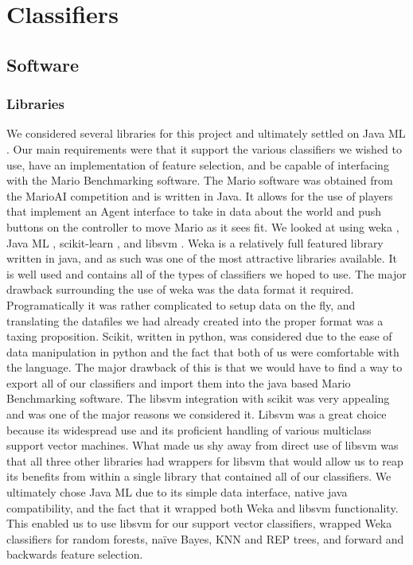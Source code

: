 \documentclass[]{article}   %
\begin{document}
\section{Classifiers}
\subsection{Software}
\subsubsection{Libraries}
We considered several libraries for this project and ultimately settled on Java ML \cite{javaml}. Our main 
requirements were that it support the various classifiers we wished to use, have an implementation of feature 
selection, and be capable of interfacing with the Mario Benchmarking \cite{mariobenchmark} software. The 
Mario software was obtained from the MarioAI competition and is written in Java. It allows for the use of 
players that implement an Agent interface to take in data about the world and push buttons on the controller 
to move Mario as it sees fit. We looked at using weka \cite{weka}, Java ML \cite{javaml}, scikit-learn 
\cite{scikit}, and libsvm \cite{libsvm}. 
\newline\newline
Weka is a relatively full featured library written in java, and as such was one of the most attractive libraries 
available. It is well used and contains all of the types of classifiers we hoped to use. The major drawback 
surrounding the use of weka was the data format it required. Programatically it was rather complicated to setup 
data on the fly, and translating the datafiles we had already created into the proper format was a taxing proposition. 
\newline\newline
Scikit, written in python, was considered due to the ease of data manipulation in python and the fact that both 
of us were comfortable with the language. The major drawback of this is that we would have to find a way to 
export all of our classifiers and import them into the java based Mario Benchmarking software. The libsvm 
integration with scikit was very appealing and was one of the major reasons we considered it.
\newline\newline
Libsvm was a great choice because its widespread use and its proficient handling of various multiclass support 
vector machines. What made us shy away from direct use of libsvm was that all three other libraries had wrappers 
for libsvm that would allow us to reap its benefits from within a single library that contained all of our classifiers.
\newline\newline
We ultimately chose Java ML due to its simple data interface, native java compatibility, and the fact that it 
wrapped both Weka and libsvm functionality. This enabled us to use libsvm for our support vector classifiers, 
wrapped Weka classifiers for random forests, na\"{i}ve Bayes, KNN and REP trees, and forward and backwards feature 
selection. 
\end{document}
